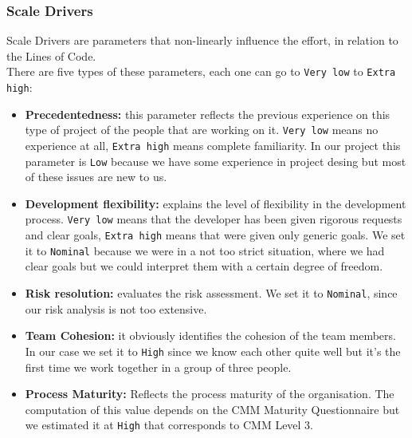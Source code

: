 \subsubsection{Scale Drivers}
Scale Drivers are parameters that non-linearly influence the effort, in relation to the Lines of Code.\\
There are five types of these parameters, each one can go to \texttt{Very low} to \texttt{Extra high}:\\
\begin{itemize}
\item{\textbf{Precedentedness:}} this parameter reflects the previous experience on this type of project of the people that are working on it. \texttt{Very low} means no experience at all, \texttt{Extra high} means complete familiarity.
	In our project this parameter is \texttt{Low} because we have some experience in project desing but most of these issues are new to us.\\
\item{\textbf{Development flexibility:}} explains the level of flexibility in the development process. \texttt{Very low} means that the developer has been given rigorous requests and clear goals, \texttt{Extra high} means that were given only generic goals.
	We set it to \texttt{Nominal} because we were in a not too strict situation, where we had clear goals but we could interpret them with a certain degree of freedom.\\
\item{\textbf{Risk resolution:}} evaluates the risk assessment. We set it to \texttt{Nominal}, since our risk analysis is not too extensive.
\item{\textbf{Team Cohesion:}} it obviously identifies the cohesion of the team members. In our case we set it to \texttt{High} since we know each other quite well but it's the first time we work together in a group of three people.\\
\item{\textbf{Process Maturity:}} Reflects the process maturity of the organisation. The computation of this value depends on the CMM Maturity Questionnaire but we estimated it at \texttt{High} that corresponds to CMM Level 3.\\
\end{itemize}




